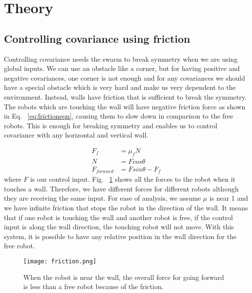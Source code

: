 \section{Theory}
\label{sec:theory}
\subsection{Controlling covariance using friction}

Controlling covariance needs the swarm to break symmetry when we are using global inputs. We can use an obstacle like a corner, but for having positive and negative covariances, one corner is not enough and for any covariances we should have a special obstacle which is very hard and make us very dependent to the environment. Instead, walls have friction that is sufficient to break the symmetry. The robots which are touching the wall will have negative friction force as shown in Eq. ~\ref{eq:frictioneqn}, causing them to slow down in comparison to the free robots. This is enough for breaking symmetry and enables us to control covariance with any horizontal and vertical wall. 

\begin{align}
\label{eq:frictioneqn}
F_f &= \mu_f N 
\\N &= F cos\theta \nonumber\\
F_{forward} &= F sin\theta - F_f \nonumber
\end{align}
where $F$ is our control input. Fig. ~\ref{fig:friction} shows all the forces to the robot when it touches a wall. Therefore, we have different forces for different robots although they are receiving the same input. For ease of analysis, we assume $\mu$ is near 1 and we have infinite friction that stops the robot in the direction of the wall. It means that if one robot is touching the wall and another robot is free, if the control input is along the wall direction, the touching robot will not move. With this system, it is possible to have any relative position in the wall direction for the free robot.

\begin{figure}[h]
\begin{center}
\texttt{[image: friction.png]}
\caption{When the robot is near the wall, the overall force for going forward is less than a free robot because of the friction.}
\label{fig:friction}
\end{center}
\end{figure} 




